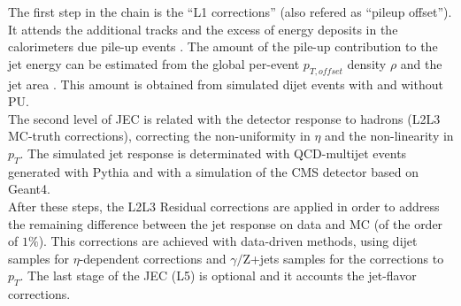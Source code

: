 The first step in the chain is the ``L1 corrections'' (also refered as ``pileup offset''). It attends the additional tracks and the excess of energy deposits
in the calorimeters due pile-up events . The amount of the pile-up contribution
to the jet energy can be estimated from the global per-event $p_{T,offset}$ density $\rho$ and the jet area \cite{JECpileup}. This amount
is obtained from simulated dijet events with and without PU. \\

The second level of JEC is related with the detector response to hadrons (L2L3 MC-truth corrections), correcting
the non-uniformity in $\eta$ and the non-linearity in $p_{T}$. The simulated jet response is determinated
with QCD-multijet events generated with Pythia and with a simulation of the CMS detector based
on Geant4.\\

After these steps, the L2L3 Residual corrections are applied in order to address the remaining difference
between the jet response on data and MC (of the order of $1 \%$). This corrections are achieved with data-driven methods, using
dijet samples for $\eta$-dependent corrections and $\gamma /$Z+jets samples for the corrections to $p_{T}$. The last stage
of the JEC (L5) is optional and it accounts the jet-flavor corrections. \\












